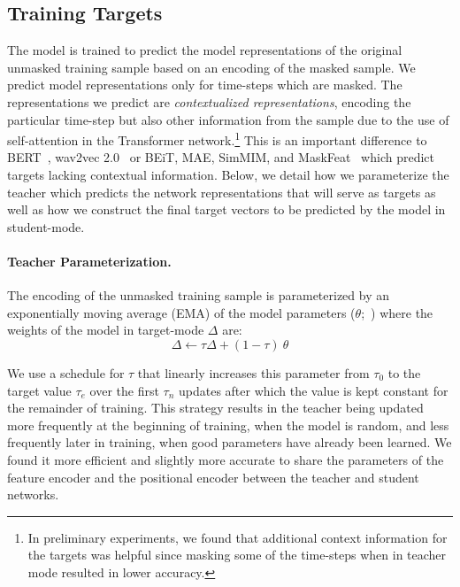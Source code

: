\documentclass[nohyperref]{article}
\theoremstyle{plain}
\theoremstyle{definition}
\theoremstyle{remark}
\begin{document}
\subsection{Training Targets}
\label{sec:method_targets}

The model is trained to predict the model representations of the original unmasked training sample based on an encoding of the masked sample.
We predict model representations only for time-steps which are masked.
The representations we predict are \emph{contextualized representations}, encoding the particular time-step but also other information from the sample due to the use of self-attention in the Transformer network.\footnote{
In preliminary experiments, we found that additional context information for the targets was helpful since masking some of the time-steps when in teacher mode resulted in lower accuracy.
}
This is an important difference to BERT~\citep{devlin2018bert}, wav2vec 2.0~\citep{baevski2020wav} or BEiT, MAE, SimMIM, and MaskFeat~\citep{bao2021beit,he2021mae,xie2021simmim,wei2021masked} which predict targets lacking contextual information.
Below, we detail how we parameterize the teacher which predicts the network representations that will serve as targets as well as how we construct the final target vectors to be predicted by the model in student-mode.

\paragraph{Teacher Parameterization.}
The encoding of the unmasked training sample is parameterized by an exponentially moving average (EMA) of the model parameters ($\theta$;~\citealt{tarvainen2018mean,grill2020byol,caron2021dino}) where the weights of the model in target-mode $\Delta$ are:
$$
\Delta \leftarrow \tau \Delta + (1 - \tau)~\theta
$$

We use a schedule for $\tau$ that linearly increases this parameter  from $\tau_0$ to the target value $\tau_e$ over the first $\tau_n$ updates after which the value is kept constant for the remainder of training.
This strategy results in the teacher being updated more frequently at the beginning of training, when the model is random, and less frequently later in training, when good parameters have already been learned. 
We found it more efficient and slightly more accurate to share the parameters of the feature encoder and the positional encoder between the teacher and student networks.
\end{document}
